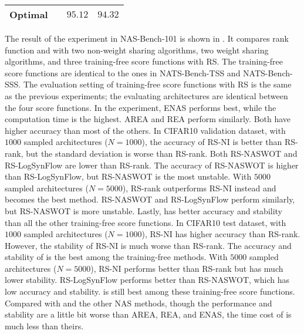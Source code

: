 \documentclass[sigconf]{acmart}
\begin{document}
\begin{table}[t]
{\begin{tabular}{@{}lrcc@{}}
            Optimal             &            & $95.12$          & $94.32$          \\ \bottomrule
            \end{tabular}
        }
        \label{table:overall_101}
        \vspace{-\baselineskip}
    \end{table}

    The result of the experiment in NAS-Bench-101 \cite{ying2019nasbench101} is shown in . 
    It compares rank function and \palg{} with two non-weight sharing algorithms, two weight 
    sharing algorithms, and three training-free score functions with RS. The training-free 
    score functions are identical to the ones in NATS-Bench-TSS and NATS-Bench-SSS. The evaluation setting 
    of training-free score functions with RS is the same as the previous experiments; the evaluating 
    architectures are identical between the four score functions. In the experiment, ENAS 
    performs best, while the computation time is the highest. AREA and REA perform similarly. 
    Both have higher accuracy than most of the others. 
    In CIFAR10 validation dataset, with $1000$ sampled architectures ($N=1000$), the accuracy of 
    RS-NI is better than RS-rank, but the standard deviation is worse than RS-rank. Both RS-NASWOT 
    and RS-LogSynFlow are lower than RS-rank. The accuracy of RS-NASWOT is higher than RS-LogSynFlow, 
    but RS-NASWOT is the most unstable. With $5000$ sampled architectures ($N=5000$), RS-rank 
    outperforms RS-NI instead and becomes the best method. RS-NASWOT and RS-LogSynFlow
    perform similarly, but RS-NASWOT is more unstable. Lastly, \palg{} has better accuracy 
    and stability than all the other training-free score functions. In CIFAR10 test dataset, with $1000$ 
    sampled architectures ($N=1000$), RS-NI has higher accuracy than RS-rank. However, the stability of 
    RS-NI is much worse than RS-rank. The accuracy and stability of \palg{} is the best among the 
    training-free methods. With $5000$ sampled architectures ($N=5000$), RS-NI performs better than 
    RS-rank but has much lower stability. RS-LogSynFlow performs better than RS-NASWOT, which 
    has low accuracy and stability. \palg{} is still best among these training-free score 
    functions. Compared with \palg{} and the other NAS methods, though the performance and stability 
    are a little bit worse than AREA, REA, and ENAS, the time cost of \palg{} is much less than theirs. 
\end{document}
